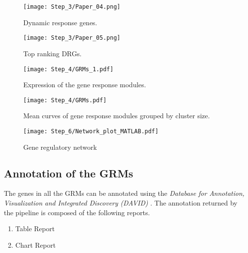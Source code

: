 \begin{figure}
\texttt{[image: Step\_3/Paper\_04.png]}
\caption{Dynamic response genes.}
\label{figure:drgs}
\end{figure}

\begin{figure}
\texttt{[image: Step\_3/Paper\_05.png]}
\caption{Top ranking DRGs.}
\label{figure:drgs}
\end{figure}

\begin{figure}
\texttt{[image: Step\_4/GRMs\_1.pdf]}
\caption{Expression of the gene response modules.}
\label{figure:grms}
\end{figure}

\begin{figure}
\texttt{[image: Step\_4/GRMs.pdf]}
\caption{Mean curves of gene response modules grouped by cluster size.}
\label{figure:grmstype}
\end{figure}

\begin{figure}
\texttt{[image: Step\_6/Network\_plot\_MATLAB.pdf]}
\caption{Gene regulatory network}
\label{fig:generegnet}
\end{figure}


\subsection{Annotation of the GRMs}
\label{section:results2}

The genes in all the GRMs can be annotated using the \textit{Database for Annotation, Visualization and Integrated Discovery (DAVID)} \cite{huang2009systematic,huang2009bioinformatics}. The annotation returned by the pipeline is composed of the following reports.

\begin{enumerate}
\setlength{\itemsep}{-1ex}
   \item Table Report
   \item Chart Report
\end{enumerate}

